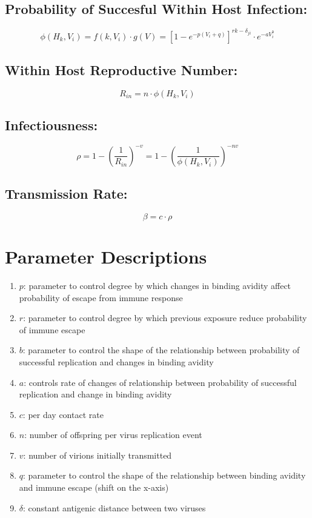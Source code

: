 \documentclass[a4paper,11pt,twoside]{article}
\begin{document}
\subsection*{Probability of Succesful Within Host Infection:}
\begin{equation}
\phi(H_k,V_i) = f(k,V_i) \cdot g(V) = [1-e^{-p(V_i+q)}]^{rk - \delta_{ji}} \cdot e^{-aV_i^b}
\end{equation}

\subsection*{Within Host Reproductive Number:}
\begin{equation}
  R_{in} = n \cdot \phi(H_k,V_i)
\end{equation}

\subsection*{Infectiousness:}
\begin{equation}
\rho = 1 - (\frac{1}{R_{in}})^{-v} = 1-(\frac{1}{\phi(H_k, V_i)})^{-nv}
\end{equation}

\subsection*{Transmission Rate:}
\begin{equation}
\beta = c \cdot \rho
\end{equation}

\section*{Parameter Descriptions}
\begin{enumerate}
\item $p$: parameter to control degree by which changes in binding avidity affect probability of escape from immune response
\item $r$: parameter to control degree by which previous exposure reduce probability of immune escape
\item $b$: parameter to control the shape of the relationship between probability of successful replication and changes in binding avidity
\item $a$: controls rate of changes of relationship between probability of successful replication and change in binding avidity
\item $c$: per day contact rate
\item $n$: number of offspring per virus replication event
\item $v$: number of virions initially transmitted
\item $q$: parameter to control the shape of the relationship between binding avidity and immune escape (shift on the x-axis)
\item $\delta$: constant antigenic distance between two viruses
\end{enumerate}
\end{document}
